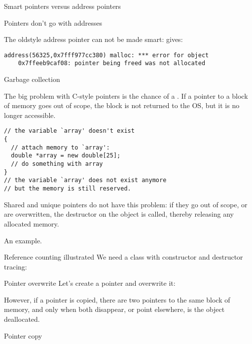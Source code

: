  {Smart pointers versus address pointers}

\begin{block}{Pointers don't go with addresses}
  \label{sl:shareaddress}

  The oldstyle  address pointer can not be made smart:
  gives:
\begin{verbatim}
address(56325,0x7fff977cc380) malloc: *** error for object
    0x7ffeeb9caf08: pointer being freed was not allocated
\end{verbatim}
\end{block}


 {Garbage collection}

The big problem with C-style pointers is the chance of a
. If a pointer to a block of memory goes out of
scope, the block is not returned to the \ac{OS}, but it is no longer
accessible.
\begin{verbatim}
// the variable `array' doesn't exist
{
  // attach memory to `array':
  double *array = new double[25];
  // do something with array
}
// the variable `array' does not exist anymore
// but the memory is still reserved.
\end{verbatim}
Shared and unique
pointers do not have this problem: if they go out of scope, or are
overwritten, the destructor on the object is called, thereby releasing
any allocated memory.

An example.

\begin{block}{Reference counting illustrated}
  \label{sl:construct-destruct-trace}
  We need a class with constructor and destructor tracing:
\end{block}

\begin{block}{Pointer overwrite}
  \label{sl:shared-ptr-overwrite}
  Let's create a pointer and overwrite it:
\end{block}

However, if a pointer is copied, there are two pointers to the same
block of memory, and only when both disappear, or point elsewhere, is
the object deallocated.

\begin{block}{Pointer copy}
  \label{sl:shared-ptr-copy}
\end{block}

